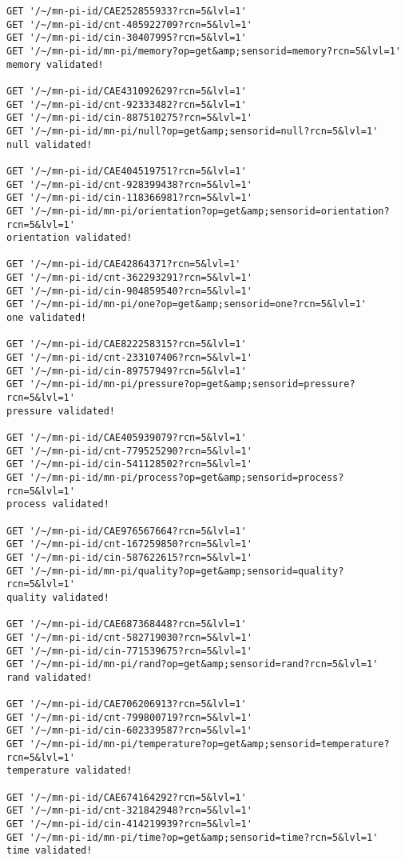 \begin{lstlisting}
GET '/~/mn-pi-id/CAE252855933?rcn=5&lvl=1'
GET '/~/mn-pi-id/cnt-405922709?rcn=5&lvl=1'
GET '/~/mn-pi-id/cin-30407995?rcn=5&lvl=1'
GET '/~/mn-pi-id/mn-pi/memory?op=get&amp;sensorid=memory?rcn=5&lvl=1'
memory validated!

GET '/~/mn-pi-id/CAE431092629?rcn=5&lvl=1'
GET '/~/mn-pi-id/cnt-92333482?rcn=5&lvl=1'
GET '/~/mn-pi-id/cin-887510275?rcn=5&lvl=1'
GET '/~/mn-pi-id/mn-pi/null?op=get&amp;sensorid=null?rcn=5&lvl=1'
null validated!

GET '/~/mn-pi-id/CAE404519751?rcn=5&lvl=1'
GET '/~/mn-pi-id/cnt-928399438?rcn=5&lvl=1'
GET '/~/mn-pi-id/cin-118366981?rcn=5&lvl=1'
GET '/~/mn-pi-id/mn-pi/orientation?op=get&amp;sensorid=orientation?rcn=5&lvl=1'
orientation validated!

GET '/~/mn-pi-id/CAE42864371?rcn=5&lvl=1'
GET '/~/mn-pi-id/cnt-362293291?rcn=5&lvl=1'
GET '/~/mn-pi-id/cin-904859540?rcn=5&lvl=1'
GET '/~/mn-pi-id/mn-pi/one?op=get&amp;sensorid=one?rcn=5&lvl=1'
one validated!

GET '/~/mn-pi-id/CAE822258315?rcn=5&lvl=1'
GET '/~/mn-pi-id/cnt-233107406?rcn=5&lvl=1'
GET '/~/mn-pi-id/cin-89757949?rcn=5&lvl=1'
GET '/~/mn-pi-id/mn-pi/pressure?op=get&amp;sensorid=pressure?rcn=5&lvl=1'
pressure validated!

GET '/~/mn-pi-id/CAE405939079?rcn=5&lvl=1'
GET '/~/mn-pi-id/cnt-779525290?rcn=5&lvl=1'
GET '/~/mn-pi-id/cin-541128502?rcn=5&lvl=1'
GET '/~/mn-pi-id/mn-pi/process?op=get&amp;sensorid=process?rcn=5&lvl=1'
process validated!

GET '/~/mn-pi-id/CAE976567664?rcn=5&lvl=1'
GET '/~/mn-pi-id/cnt-167259850?rcn=5&lvl=1'
GET '/~/mn-pi-id/cin-587622615?rcn=5&lvl=1'
GET '/~/mn-pi-id/mn-pi/quality?op=get&amp;sensorid=quality?rcn=5&lvl=1'
quality validated!

GET '/~/mn-pi-id/CAE687368448?rcn=5&lvl=1'
GET '/~/mn-pi-id/cnt-582719030?rcn=5&lvl=1'
GET '/~/mn-pi-id/cin-771539675?rcn=5&lvl=1'
GET '/~/mn-pi-id/mn-pi/rand?op=get&amp;sensorid=rand?rcn=5&lvl=1'
rand validated!

GET '/~/mn-pi-id/CAE706206913?rcn=5&lvl=1'
GET '/~/mn-pi-id/cnt-799800719?rcn=5&lvl=1'
GET '/~/mn-pi-id/cin-602339587?rcn=5&lvl=1'
GET '/~/mn-pi-id/mn-pi/temperature?op=get&amp;sensorid=temperature?rcn=5&lvl=1'
temperature validated!

GET '/~/mn-pi-id/CAE674164292?rcn=5&lvl=1'
GET '/~/mn-pi-id/cnt-321842948?rcn=5&lvl=1'
GET '/~/mn-pi-id/cin-414219939?rcn=5&lvl=1'
GET '/~/mn-pi-id/mn-pi/time?op=get&amp;sensorid=time?rcn=5&lvl=1'
time validated!


\end{lstlisting}
